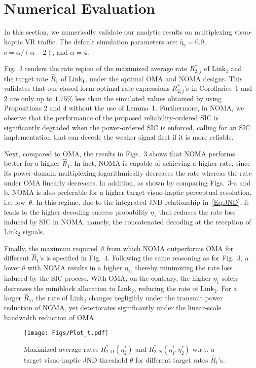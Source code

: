 \documentclass[conference]{IEEEtran}
\def\R{{\hat{R}_1}}
\def\OMA{\text{O}}
\def\NOMA{\text{N}}
\def\L{\text{Link}}
\def\figwidth{8.5 cm}
\begin{document}
\section{Numerical Evaluation}
In this section, we numerically validate our analytic results on multiplexing visuo-haptic VR traffic. The default simulation parameters are: $\hat{\eta}_2=0.9$, $c = \alpha/(\alpha-2)$, and $\alpha=4$.

Fig.~3 renders the rate region of the maximized average rate $R_{2,j}^*$ of $\L_2$ and the target rate $\R$ of $\L_1$, under the optimal OMA and NOMA designs. This validates that our closed-form optimal rate expressions $R_{2,j}^*$'s in Corollaries~$1$ and $2$ are only up to $1.75$\% less than the simulated values obtained by using Propositions $2$ and $4$ without the use of Lemma~1. Furthermore, in NOMA, we observe that the performance of the proposed reliability-ordered SIC is significantly degraded when the power-ordered SIC is enforced, calling for an SIC implementation that can decode the weaker signal first if it is more reliable.

Next, compared to OMA, the results in Figs.~3 shows that NOMA performs better for a higher $\R$. In fact, NOMA is capable of achieving a higher rate, since its power-domain multiplexing logarithmically decreases the rate whereas the rate under OMA linearly decreases. In addition, as shown by comparing Figs.~3-a and b, NOMA is also preferable for a higher target visuo-haptic perceptual resolution, i.e. low~$\theta$. In this regime, due to the integrated JND relationship in~\eqref{Eq:JND}, it leads to the higher decoding success probability $\eta_1$ that reduces the rate loss induced by SIC in NOMA, namely, the concatenated decoding at the reception of $\L_2$ signals.

Finally, the maximum required~$\theta$ from which NOMA outperforms OMA for different $\R$'s is specified in Fig.~4. Following the same reasoning as for Fig.~3, a lower $\theta$ with NOMA results in a higher $\eta_1$, thereby minimizing the rate loss induced by the SIC process. With OMA, on the contrary, the higher $\eta_1$ solely decreases the miniblock allocation to $\L_2$, reducing the rate of $\L_2$. For a larger $\R$, the rate of $\L_2$ changes negligibly under the transmit power reduction of NOMA, yet deteriorates significantly under the linear-scale bandwidth reduction of OMA.



\begin{figure}
\centering
\texttt{[image: Figs/Plot\_t.pdf]}
\caption{\small Maximized average rates $R_{2,\OMA}^*(\eta_2^*)$ and $R_{2,\NOMA}^*(\eta_1^*,\eta_2^*)$ w.r.t. a target visuo-haptic JND threshold $\theta$ for different target rates $\R$'s.}
\end{figure}
\end{document}
